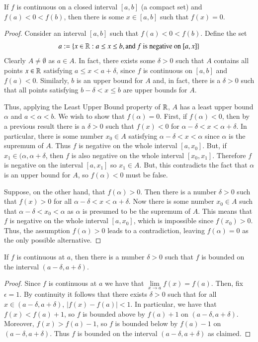 \documentclass[12pt, a4paper, oneside, openright, titlepage]{book}
\begin{document}
\begin{thm}
    If $f$ is continuous on a closed interval $[a,b]$ (a compact set) and $f(a) < 0 < f(b)$, then there is some $x \in [a,b]$ such that $f(x) = 0$.
\end{thm}
\begin{proof}
    Consider an interval $[a,b]$ such that $f(a) < 0 < f(b)$. Define the set $$a := \{x\in \mathbb R:a\leq x \leq b,\text{and $f$ is negative on $[a,x]$}\}$$
    Clearly $A \neq \emptyset$ as $a \in A$. In fact, there exists some $\delta > 0$ such that $A$ contains all points $x \in \mathbb R$ satisfying $a \leq x < a+\delta$, since $f$ is continuous on $[a,b]$ and $f(a) < 0$. Similarly, $b$ is an upper bound for $A$ and, in fact, there is a $\delta > 0$ such that all points satisfying $b-\delta < x \leq b$ are upper bounds for $A$.

    Thus, applying the Least Upper Bound property of $\mathbb R$, $A$ has a least upper bound $\alpha$ and $a<\alpha < b$. We wish to show that $f(\alpha) = 0$. First, if $f(\alpha) < 0$, then by a previous result there is a $\delta > 0$ such that $f(x) < 0$ for $\alpha - \delta < x < \alpha + \delta$. In particular, there is some number $x_0 \in A$ satisfying $\alpha - \delta < x < \alpha$ since $\alpha$ is the supremum of $A$. Thus $f$ is negative on the whole interval $[a,x_0]$. But, if $x_1 \in (\alpha, \alpha+\delta$, then $f$ is also negative on the whole interval $[x_0,x_1]$. Therefore $f$ is negative on the interval $[a,x_1]$ so $x_1 \in A$. But, this contradicts the fact that $\alpha$ is an upper bound for $A$, so $f(\alpha) < 0$ must be false.


    Suppose, on the other hand, that $f(\alpha) > 0$. Then there is a number $\delta > 0$ such that $f(x) > 0$ for all $\alpha - \delta < x < \alpha + \delta$. Now there is some number $x_0 \in A$ such that $\alpha - \delta < x_0 < \alpha$ as $\alpha$ is presumed to be the supremum of $A$. This means that $f$ is negative on the whole interval $[a,x_0]$, which is impossible since $f(x_0) > 0$. Thus, the assumption $f(\alpha) > 0$ leads to a contradiction, leaving $f(\alpha) = 0$ as the only possible alternative. 
\end{proof}

\begin{lem}
    If $f$ is continuous at $a$, then there is a number $\delta > 0$ such that $f$ is bounded on the interval $(a-\delta, a+\delta)$.
\end{lem}
\begin{proof}
    Since $f$ is continuous at $a$ we have that $\lim\limits_{x\rightarrow a}f(x) = f(a)$. Then, fix $\epsilon = 1$. By continuity it follows that there exists $\delta > 0$ such that for all $x \in (a-\delta, a+\delta)$, $|f(x) - f(a)| < 1$. In particular, we have that $f(x) < f(a) + 1$, so $f$ is bounded above by $f(a)+1$ on $(a-\delta,a+\delta)$. Moreover, $f(x) > f(a) - 1$, so $f$ is bounded below by $f(a) -1$ on $(a-\delta, a+\delta)$. Thus $f$ is bounded on the interval $(a-\delta,a+\delta)$ as claimed.
\end{proof}
\end{document}
